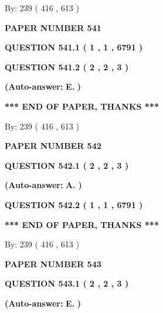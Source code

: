 \documentclass[12pt]{article}
\begin{document}
   
\hspace{1.0in} By: 
 239 ( 416 ,  613 )
   
   
   
   
\newpage 
\setcounter{page}{ 
   541001 } 
   
   
 {\textbf{ \Large{ PAPER NUMBER  541  }}}
   
   
   
   
  
  
{\textbf{\large{QUESTION
541.1 
 ( 1 , 1 , 6791 )
}}}
  
  
{\textbf{\large{QUESTION
541.2 
 ( 2 , 2 , 3 )
}}}
 
 
{\textbf{(Auto-answer:}}
{\textbf{\large{
E.}}}
{\textbf{)}}
 
 
   
   
   
   
\vspace{1.0in} 
{\textbf{\large{ *** END OF PAPER, THANKS *** }}} 
   
   
\hspace{1.0in} By: 
 239 ( 416 ,  613 )
   
   
   
   
\newpage 
\setcounter{page}{ 
   542001 } 
   
   
 {\textbf{ \Large{ PAPER NUMBER  542  }}}
   
   
   
   
  
  
{\textbf{\large{QUESTION
542.1 
 ( 2 , 2 , 3 )
}}}
 
 
{\textbf{(Auto-answer:}}
{\textbf{\large{
A.}}}
{\textbf{)}}
 
 
  
  
{\textbf{\large{QUESTION
542.2 
 ( 1 , 1 , 6791 )
}}}
   
   
   
   
\vspace{1.0in} 
{\textbf{\large{ *** END OF PAPER, THANKS *** }}} 
   
   
\hspace{1.0in} By: 
 239 ( 416 ,  613 )
   
   
   
   
\newpage 
\setcounter{page}{ 
   543001 } 
   
   
 {\textbf{ \Large{ PAPER NUMBER  543  }}}
   
   
   
   
  
  
{\textbf{\large{QUESTION
543.1 
 ( 2 , 2 , 3 )
}}}
 
 
{\textbf{(Auto-answer:}}
{\textbf{\large{
E.}}}
{\textbf{)}}
 
\end{document}
